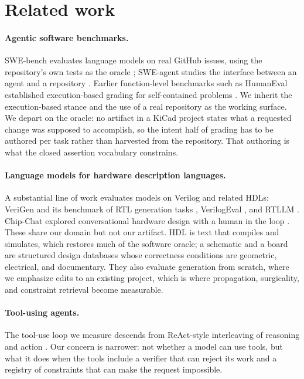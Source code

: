 \section{Related work}

\paragraph{Agentic software benchmarks.} SWE-bench evaluates language models on real GitHub issues, using the repository's own tests as the oracle \citep{swebench}; SWE-agent studies the interface between an agent and a repository \citep{sweagent}. Earlier function-level benchmarks such as HumanEval established execution-based grading for self-contained problems \citep{humaneval}. We inherit the execution-based stance and the use of a real repository as the working surface. We depart on the oracle: no artifact in a KiCad project states what a requested change was supposed to accomplish, so the intent half of grading has to be authored per task rather than harvested from the repository. That authoring is what the closed assertion vocabulary constrains.

\paragraph{Language models for hardware description languages.} A substantial line of work evaluates models on Verilog and related HDLs: VeriGen and its benchmark of RTL generation tasks \citep{verigen}, VerilogEval \citep{verilogeval}, and RTLLM \citep{rtllm}. Chip-Chat explored conversational hardware design with a human in the loop \citep{chipchat}. These share our domain but not our artifact. HDL is text that compiles and simulates, which restores much of the software oracle; a schematic and a board are structured design databases whose correctness conditions are geometric, electrical, and documentary. They also evaluate generation from scratch, where we emphasize edits to an existing project, which is where propagation, surgicality, and constraint retrieval become measurable.

\paragraph{Tool-using agents.} The tool-use loop we measure descends from ReAct-style interleaving of reasoning and action \citep{react}. Our concern is narrower: not whether a model can use tools, but what it does when the tools include a verifier that can reject its work and a registry of constraints that can make the request impossible.

